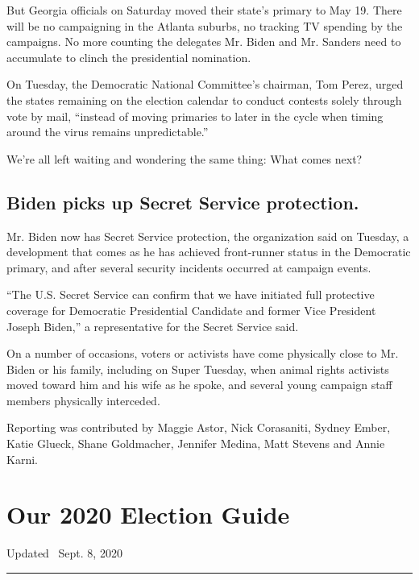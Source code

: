 But Georgia officials on Saturday moved their state's primary to May 19.
There will be no campaigning in the Atlanta suburbs, no tracking TV
spending by the campaigns. No more counting the delegates Mr. Biden and
Mr. Sanders need to accumulate to clinch the presidential nomination.

On Tuesday, the Democratic National Committee's chairman, Tom Perez,
urged the states remaining on the election calendar to conduct contests
solely through vote by mail, ``instead of moving primaries to later in
the cycle when timing around the virus remains unpredictable.''

We're all left waiting and wondering the same thing: What comes next?

\hypertarget{biden-picks-up-secret-service-protection}{%
\subsection{Biden picks up Secret Service
protection.}\label{biden-picks-up-secret-service-protection}}

Mr. Biden now has Secret Service protection, the organization said on
Tuesday, a development that comes as he has achieved front-runner status
in the Democratic primary, and after several security incidents occurred
at campaign events.

``The U.S. Secret Service can confirm that we have initiated full
protective coverage for Democratic Presidential Candidate and former
Vice President Joseph Biden,'' a representative for the Secret Service
said.

On a number of occasions, voters or activists have come physically close
to Mr. Biden or his family, including on Super Tuesday, when animal
rights activists moved toward him and his wife as he spoke, and several
young campaign staff members physically interceded.

Reporting was contributed by Maggie Astor, Nick Corasaniti, Sydney
Ember, Katie Glueck, Shane Goldmacher, Jennifer Medina, Matt Stevens and
Annie Karni.

\hypertarget{our-2020-election-guide}{%
\section{Our 2020 Election Guide}\label{our-2020-election-guide}}

Updated ~Sept. 8, 2020

\begin{center}\rule{0.5\linewidth}{\linethickness}\end{center}

